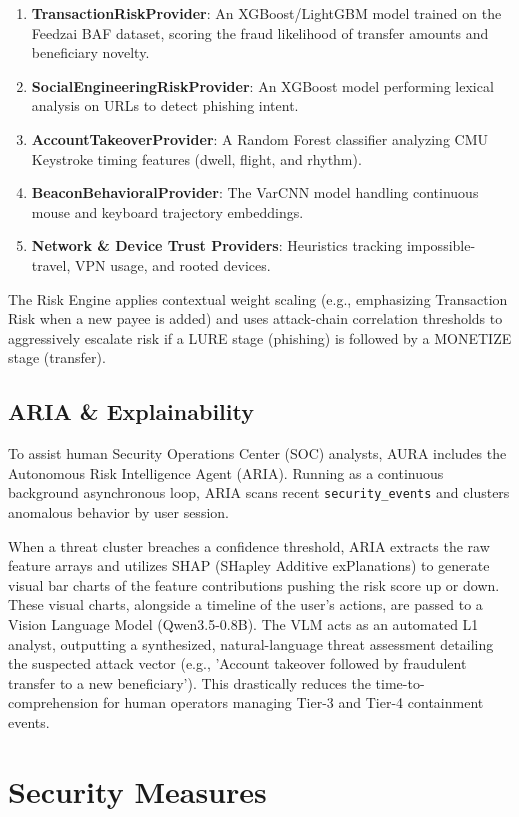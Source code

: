 \documentclass[11pt,journal,onecolumn]{article}
\begin{document}
\begin{enumerate}
    \item \textbf{TransactionRiskProvider}: An XGBoost/LightGBM model trained on the Feedzai BAF dataset, scoring the fraud likelihood of transfer amounts and beneficiary novelty.
    \item \textbf{SocialEngineeringRiskProvider}: An XGBoost model performing lexical analysis on URLs to detect phishing intent.
    \item \textbf{AccountTakeoverProvider}: A Random Forest classifier analyzing CMU Keystroke timing features (dwell, flight, and rhythm).
    \item \textbf{BeaconBehavioralProvider}: The VarCNN model handling continuous mouse and keyboard trajectory embeddings.
    \item \textbf{Network \& Device Trust Providers}: Heuristics tracking impossible-travel, VPN usage, and rooted devices.
\end{enumerate}

The Risk Engine applies contextual weight scaling (e.g., emphasizing Transaction Risk when a new payee is added) and uses attack-chain correlation thresholds to aggressively escalate risk if a LURE stage (phishing) is followed by a MONETIZE stage (transfer).

\subsection{ARIA \& Explainability}
To assist human Security Operations Center (SOC) analysts, AURA includes the Autonomous Risk Intelligence Agent (ARIA). Running as a continuous background asynchronous loop, ARIA scans recent \texttt{security\_events} and clusters anomalous behavior by user session. 

When a threat cluster breaches a confidence threshold, ARIA extracts the raw feature arrays and utilizes SHAP (SHapley Additive exPlanations) to generate visual bar charts of the feature contributions pushing the risk score up or down. These visual charts, alongside a timeline of the user's actions, are passed to a Vision Language Model (Qwen3.5-0.8B). The VLM acts as an automated L1 analyst, outputting a synthesized, natural-language threat assessment detailing the suspected attack vector (e.g., 'Account takeover followed by fraudulent transfer to a new beneficiary'). This drastically reduces the time-to-comprehension for human operators managing Tier-3 and Tier-4 containment events.

\section{Security Measures}
\end{document}
